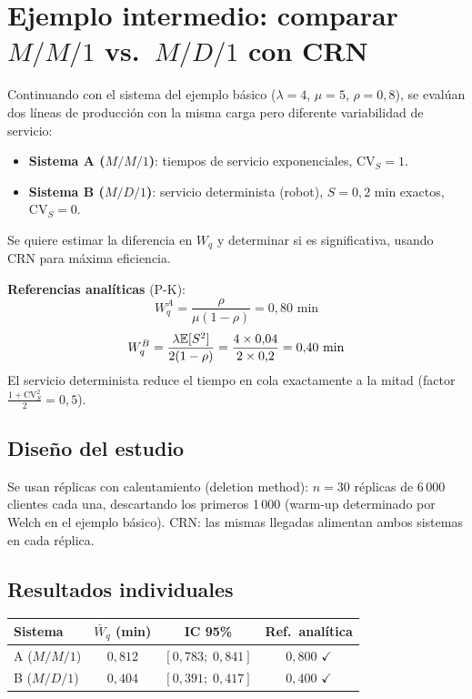 \documentclass[11pt, letterpaper]{article}
\begin{document}
\section{Ejemplo intermedio: comparar $M/M/1$ vs.\ $M/D/1$ con CRN}

\begin{ejemplobox}[Sistema]
Continuando con el sistema del ejemplo básico ($\lambda=4$, $\mu=5$, $\rho=0{,}8$), se evalúan dos líneas de producción con la misma carga pero diferente variabilidad de servicio:
\begin{itemize}
    \item \textbf{Sistema A ($M/M/1$)}: tiempos de servicio exponenciales, $\text{CV}_S=1$.
    \item \textbf{Sistema B ($M/D/1$)}: servicio determinista (robot), $S=0{,}2$ min exactos, $\text{CV}_S=0$.
\end{itemize}
Se quiere estimar la diferencia en $W_q$ y determinar si es significativa, usando CRN para máxima eficiencia.
\end{ejemplobox}

\textbf{Referencias analíticas} (P-K):
\[
W_q^A = \frac{\rho}{\mu(1-\rho)} = 0{,}80 \text{ min}
\]
\[
W_q^B = \frac{\lambda\mathbb{E}[S^2]}{2(1-\rho)} = \frac{4 \times 0{,}04}{2 \times 0{,}2} = 0{,}40 \text{ min}
\]
El servicio determinista reduce el tiempo en cola exactamente a la mitad (factor $\frac{1+\text{CV}_S^2}{2} = 0{,}5$).

\subsection{Diseño del estudio}

Se usan réplicas con calentamiento (deletion method): $n=30$ réplicas de 6\,000 clientes cada una, descartando los primeros 1\,000 (warm-up determinado por Welch en el ejemplo básico). CRN: las mismas llegadas alimentan ambos sistemas en cada réplica.

\subsection{Resultados individuales}

\begin{center}\small
\renewcommand{\arraystretch}{1.3}
\begin{tabular}{lccc}
\toprule
\textbf{Sistema} & $\bar W_q$ (min) & IC 95\% & Ref.\ analítica \\
\midrule
A ($M/M/1$) & $0{,}812$ & $[0{,}783;\;0{,}841]$ & $0{,}800$ $\checkmark$ \\
B ($M/D/1$) & $0{,}404$ & $[0{,}391;\;0{,}417]$ & $0{,}400$ $\checkmark$ \\
\bottomrule
\end{tabular}
\end{center}
\end{document}
